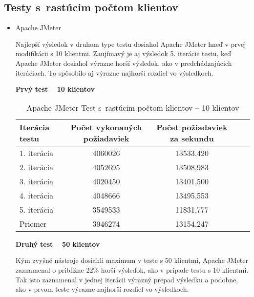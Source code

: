 \documentclass[12pt,oneside,final]{fithesis-utf8}
\begin{document}
\subsection{Testy s~rastúcim počtom klientov}

\begin{itemize}

\item Apache JMeter

Najlepší výsledok v druhom type testu dosiahol Apache JMeter hneď v prvej modifikácii s 10 klientmi. Zaujímavý je aj výsledok 5. iterácie testu, keď Apache JMeter dosiahol výrazne horší výsledok, ako v predchádzajúcich iteráciach. To spôsobilo aj výrazne najhorší rozdiel vo výsledkoch.

\textbf{Prvý test -- 10 klientov}

\begin{table}[H]
\begin{center}
\begin{tabular}{ | l | c | c | c | c |}
		\hline
		 \textbf{Iterácia testu} & \textbf{Počet vykonaných požiadaviek} & \textbf{Počet požiadaviek za sekundu} \\ \hline
		 1. iterácia & 4060026 & 13533,420 \\ \hline
		 2. iterácia & 4052695 & 13508,983 \\ \hline
		 3. iterácia & 4020450 & 13401,500 \\ \hline
		 4. iterácia & 4048666 & 13495,553 \\ \hline
		 5. iterácia & 3549533 & 11831,777 \\ \hline
		 Priemer & 3946274 & 13154,247 \\ \hline
		 
\end{tabular}
\end{center}
\caption{Apache JMeter Test s~rastúcim počtom klientov -- 10 klientov}
\end{table}


\textbf{Druhý test -- 50 klientov}

Kým zvyšné nástroje dosiahli maximum v teste s 50 klientmi, Apache JMeter zaznamenal o približne 22\% horší výsledok, ako v prípade testu s 10 klientmi. Tak isto zaznamenal v jednej iterácii výrazný prepad výsledku a podobne, ako v prvom teste výrazne najhorší rozdiel vo výsledkoch.


\end{itemize}
\end{document}
